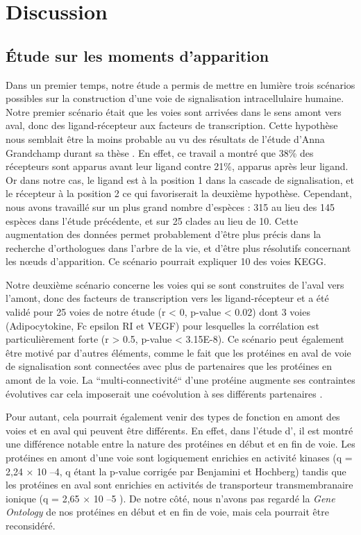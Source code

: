 \chapter{Discussion}
\thispagestyle{firstpage}
\onehalfspacing

\section{Étude sur les moments d’apparition}
\par Dans un premier temps, notre étude a permis de mettre en lumière trois scénarios possibles sur la construction d’une voie de signalisation intracellulaire humaine. Notre premier scénario était que les voies sont arrivées dans le sens amont vers aval, donc des ligand-récepteur aux facteurs de transcription. Cette hypothèse nous semblait être la moins probable au vu des résultats de l’étude d’Anna Grandchamp durant sa thèse \parencite{grandchamp_synchronous_2018}. En effet, ce travail a montré que 38\% des récepteurs sont apparus avant leur ligand contre 21\%, apparus après leur ligand. Or dans notre cas, le ligand est à la position 1 dans la cascade de signalisation, et le récepteur à la position 2 ce qui favoriserait la deuxième hypothèse. Cependant, nous avons travaillé sur un plus grand nombre d’espèces : 315 au lieu des 145 espèces dans l’étude précédente, et sur 25 clades au lieu de 10. Cette augmentation des données permet probablement d’être plus précis dans la recherche d’orthologues dans l’arbre de la vie, et d’être plus résolutifs concernant les nœuds d’apparition. Ce scénario pourrait expliquer 10 des voies KEGG. 
\par Notre deuxième scénario concerne les voies qui se sont construites de l’aval vers l’amont, donc des facteurs de transcription vers les ligand-récepteur et a été validé pour 25 voies de notre étude (r < 0, p-value < 0.02) dont 3 voies (Adipocytokine, Fc epsilon RI et VEGF) pour lesquelles la corrélation est particulièrement forte (r > 0.5, p-value < 3.15E-8). Ce scénario peut également être motivé par d’autres éléments, comme le fait que les protéines en aval de voie de signalisation sont connectées avec plus de partenaires que les protéines en amont de la voie. La “multi-connectivité“ d’une protéine augmente ses contraintes évolutives car cela imposerait une coévolution à ses différents partenaires \parencite{fraser_evolutionary_2002, hahn_molecular_2004, krylov_gene_2003}. 
\par Pour autant, cela pourrait également venir des types de fonction en amont des voies et en aval qui peuvent être différents. En effet, dans l’étude d’\cite{alvarez-ponce_relationship_2012}, il est montré une différence notable entre la nature des protéines en début et en fin de voie. Les protéines en amont d’une voie sont logiquement enrichies en activité kinases (q = 2,24 × 10 –4, q étant la p-value corrigée par Benjamini et Hochberg) tandis que les protéines en aval sont enrichies en activités de transporteur transmembranaire ionique (q = 2,65 × 10 –5 ). De notre côté, nous n’avons pas regardé la \textit{Gene Ontology} de nos protéines en début et en fin de voie, mais cela pourrait être reconsidéré.
